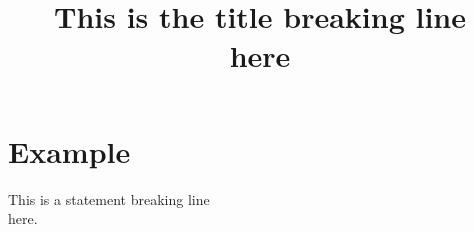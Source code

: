 \documentclass[a4paper,11pt,oneside,openany,report]{jsbook}
\title{This is the title breaking line{\\}here}
\begin{document}
\maketitle
\chapter{Example}\label{ch:Example}
This is a statement breaking line{\\}here.
\end{document}
